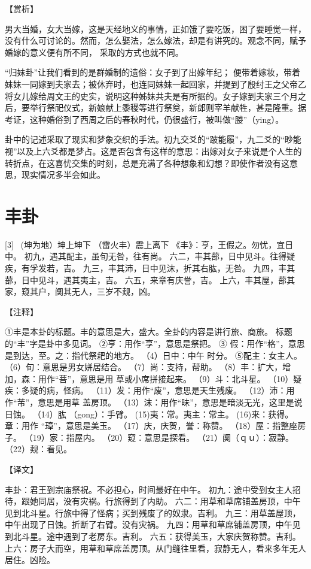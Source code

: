 \documentclass[12pt,UTF8]{ctexbook}
\begin{document}
【赏析】

男大当婚，女大当嫁，这是天经地义的事情，正如饿了要吃饭，困了要睡觉一样，没有什么可讨论的。然而，怎么娶法，怎么嫁法，却是有讲究的。观念不同，赋予婚嫁的意义便有所不同， 采取的方式也就不同。

“归妹卦”让我们看到的是群婚制的遗俗：女子到了出嫁年纪； 便带着嫁妆，带着妹妹一同嫁到夫家去；被休弃时，也连同妹妹一起回家，并提到了殷纣王之父帝乙将女儿嫁给周文王的史实，说明这种姊妹共夫是有所据的。女子嫁到夫家三个月之后，要举行祭祀仪式，新娘献上黍稷等进行祭奠，新郎则宰羊献牲，甚是隆重。据考证，这种婚俗到了西周之后的春秋时代，仍很盛行，被叫做“媵”（ying）。

卦中的记述采取了现实和梦象交织的手法。初九交爻的“跛能履”，九二爻的“眇能视”以及上六爻都是梦占。这是否包含有这样的意思：出嫁对女子来说是个人生的转折点，在这喜忧交集的时刻，总是充满了各种想象和幻想？即使作者没有这意思，现实情况多半会如此。

\chapter{丰卦}
[3] \ (坤为地）坤上坤下
（雷火丰）震上离下
《丰》：亨，王假之。勿忧，宜日中。
初九，遇其配主，虽旬无咎，往有尚。
六二，丰其蔀，日中见斗。往得疑疾，有孚发若，吉。
九三，丰其沛，日中见沫，折其右肱，无咎。
九四，丰其蔀，日中见斗，遇其夷主，吉。
六五，来章有庆誉，吉。
上六，丰其屋，蔀其家，窥其户，阒其无人，三岁不觌，凶。

【注释】

①丰是本卦的标题。丰的意思是大，盛大。全卦的内容是讲行旅、商旅。 标题的“丰”字是卦中多见词。
②亨：用作“享”，意思是祭把。
③ 假：用作“格”，意思是到达，至。之：指代祭耙的地方。
（4）日中：中午 时分。
⑤配主：女主人。
（6）旬：意思是男女姘居结合。
（7）尚：支持，帮助。
（8）丰：扩大，增加，森：用作“菩”，意思是用 草或小席拼接起来。
（9）斗：北斗星。
（10）疑疾：多疑的病，怪病。
（11）发：用作“废”，意思是天生残废。
（12）沛：用作“芾”，意思是用草 盖房顶。
（13）沫：用作“昧”，意思是暗淡无光，这里是说日蚀。
（14）肱 （gong）：手臂。
(15)夷：常。夷主：常主。
(16)来：获得。章：用作 “璋”，意思是美玉。
（17）庆，庆贺，誉：称赞。
（18）屋：指整座房子。
（19）家：指屋内。
（20）窥：意思是探看。
（21）阒（ｑｕ）：寂静。
（22）觌：看见。

【译文】

丰卦：君王到宗庙祭祝。不必担心，时间最好在中午。
初九：途中受到女主人招待，跟她同居，没有灾祸。行旅得到了内助。
六二：用草和草席铺盖房顶，中午见到北斗星。行旅中得了怪病；买到残废了的奴隶。吉利。
九三：用草盖屋顶，中午出现了日蚀。折断了右臂。没有灾祸。
九四：用草和草席铺盖房顶，中午见到北斗星。途中遇到了老房东。吉利。
六五：获得美玉，大家庆贺称赞。吉利。
上六：房子大而空，用草和草席盖房顶。从门缝往里看，寂静无人，看来多年无人居住。凶险。
\end{document}
